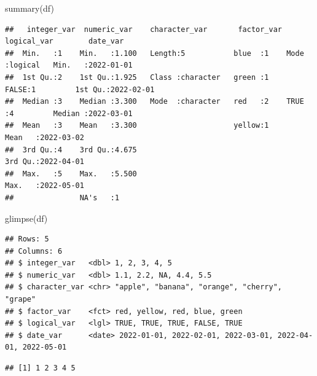 \documentclass[
  12pt,
  oneside]{book}
\newenvironment{Shaded}{\begin{snugshade}}{\end{snugshade}}
\newcommand{\CommentTok}[1]{\textcolor[rgb]{0.56,0.35,0.01}{\textit{#1}}}
\newcommand{\FunctionTok}[1]{\textcolor[rgb]{0.00,0.00,0.00}{#1}}
\newcommand{\NormalTok}[1]{#1}
\newcommand{\SpecialCharTok}[1]{\textcolor[rgb]{0.00,0.00,0.00}{#1}}
\theoremstyle{definition}
\theoremstyle{definition}
\theoremstyle{definition}
\theoremstyle{definition}
\theoremstyle{remark}
\begin{document}
\begin{Shaded}
\begin{Highlighting}[]
\FunctionTok{summary}\NormalTok{(df)}
\end{Highlighting}
\end{Shaded}

\begin{verbatim}
##   integer_var  numeric_var    character_var       factor_var logical_var        date_var         
##  Min.   :1    Min.   :1.100   Length:5           blue  :1    Mode :logical   Min.   :2022-01-01  
##  1st Qu.:2    1st Qu.:1.925   Class :character   green :1    FALSE:1         1st Qu.:2022-02-01  
##  Median :3    Median :3.300   Mode  :character   red   :2    TRUE :4         Median :2022-03-01  
##  Mean   :3    Mean   :3.300                      yellow:1                    Mean   :2022-03-02  
##  3rd Qu.:4    3rd Qu.:4.675                                                  3rd Qu.:2022-04-01  
##  Max.   :5    Max.   :5.500                                                  Max.   :2022-05-01  
##               NA's   :1
\end{verbatim}

\begin{Shaded}
\begin{Highlighting}[]
\FunctionTok{glimpse}\NormalTok{(df)}
\end{Highlighting}
\end{Shaded}

\begin{verbatim}
## Rows: 5
## Columns: 6
## $ integer_var   <dbl> 1, 2, 3, 4, 5
## $ numeric_var   <dbl> 1.1, 2.2, NA, 4.4, 5.5
## $ character_var <chr> "apple", "banana", "orange", "cherry", "grape"
## $ factor_var    <fct> red, yellow, red, blue, green
## $ logical_var   <lgl> TRUE, TRUE, TRUE, FALSE, TRUE
## $ date_var      <date> 2022-01-01, 2022-02-01, 2022-03-01, 2022-04-01, 2022-05-01
\end{verbatim}

\begin{Shaded}
\end{Shaded}

\begin{verbatim}
## [1] 1 2 3 4 5
\end{verbatim}
\end{document}
